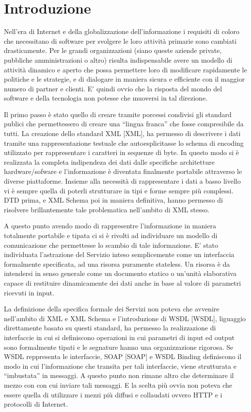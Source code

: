 \chapter{Introduzione}

Nell'era di Internet e della globalizzazione dell'informazione i requisiti di
coloro che necessitano di software per svolgere le loro attività primarie sono
cambiati drasticamente. Per le grandi organizzazioni (siano queste aziende
private, pubbliche amministrazioni o altro) risulta indispensabile avere un
modello di attività dinamico e aperto che possa permettere loro di modificare
rapidamente le politiche e le strategie, e di dialogare in maniera sicura e
efficiente con il maggior numero di partner e clienti. E' quindi ovvio che la
risposta del mondo del software e della tecnologia non potesse che muoversi in
tal direzione. 

Il primo passo è stato quello di creare tramite porcessi condivisi gli standard
publici che permettessero di creare una ``lingua franca'' che fosse
compresibile da tutti. La creazione dello standard XML [XML], ha permesso di
descrivere i dati tramite una rappresentazione testuale che autoesplicitasse
lo schema di encoding utilizzato per rappresentare i caratteri in sequenze di
byte. In questo modo si è realizzata la completa indipendeza dei dati dalle
specifiche architetture hardware/sofware e l'informazione è diventata finalmente
portabile attraverso le diverse piattaforme. Insieme alla necessità di
rappresentare i dati a basso livello vi è sempre quella di poterli strutturare
in tipi e forme sempre più complessi. DTD prima, e XML Schema poi in maniera
definitiva, hanno permesso di risolvere brillantemente tale problematica
nell'ambito di XML stesso.

A questo punto avendo modo di rappresentre l'informazione in maniera totalmente
portabile e tipata ci si è rivolti ad individuare un modello di
comunicazione che permettesse lo scambio di tale informazione. E' stato
individuata l'astrazione del Servizio inteso semplicemente come un interfaccia
formalmente specificata, ad una risorsa puramente stateless. Un risorsa è da
intendersi in senso generale come un documento statico o un'unità
elaborativa capace di restituire dinamicamente dei dati anche in base al valore
di parametri ricevuti in input.

La definizione della specifica formale dei Servizi non poteva che avvenire
nell'ambito di XML e XML Schema e l'introduzione di WSDL [WSDL], liguaggio
direttamente basato su questi standard, ha permesso la realizzazione di
interfaccie in cui si definiscono operazioni in cui parametri di input ed output
sono formalmente tipati e le segnature hanno una organizzazione rigorosa. Se WSDL
reppresenta le interfaccie, SOAP [SOAP] e WSDL Binding definiscono il modo in cui
l'informazione che transita per tali interfaccie, viene strutturata e
``imbustata'' in messaggi. A questo punto non rimane altro che determinare il
mezzo con con cui inviare tali messaggi. E la scelta più ovvia non poteva che essere
quella di utilizzare i mezzi più diffusi e collaudati ovvero HTTP e i protocolli di
Internet.


